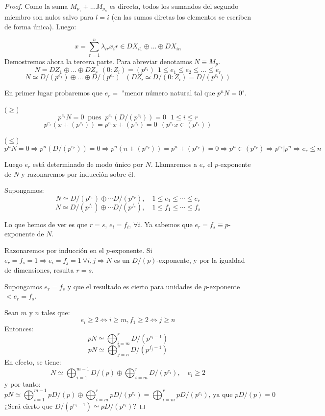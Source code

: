 \documentclass{article}
\theoremstyle{theorem-style}  %
\theoremstyle{definition}
\theoremstyle{example-style}
\begin{document}
\begin{proof}
		Como la suma $M_{p_1}+\dots M_{p_h}$ es directa, todos los sumandos del segundo miembro son nulos salvo para $l=i$ (en las sumas diretas los elementos se escriben de forma única). Luego:

		\[x=\sum_{r=1}^n\lambda_{ir}x_ir \in DX_{i1}\oplus\dots\oplus DX_{in}\]
		Demostremos ahora la tercera parte. Para abreviar denotamos $N\equiv M_p$.
		\[N=DZ_1\oplus\dots\oplus DZ_r \ \ (0:Z_i)=(p^{e_i}) \ \ 1\leq e_1\leq e_2 \leq\dots\leq e_r\]
		\[N\simeq D/(p^{e_1})\oplus\dots\oplus D/(p^{e_r}) \ \ \ (DZ_i\simeq D/(0:Z_i)=D/(p^{e_i})) \]

		En primer lugar probaremos que $e_r=$ "menor número natural tal que $p^nN=0$".
		
		($\geq$)
		\[p^{e_r}N=0 \  \text{ pues } \ p^{e_r}(D/(p^{e_i}))=0 \ \ \ 1\leq i\leq r\]
		\[p^{e_r}(x+(p^{e_i}))=p^{e_r}x+(p^{e_i})=0 \ \ (p^{e_r}x\in (p^{e_i}))\]

		($\leq$)
		\[p^nN=0\Rightarrow p^n(D/(p^{e_r}))=0 \Rightarrow p^n(n+(p^{e_r}))=p^n+(p^{e_r})=0 \Rightarrow p^n\in (p^{e_r}) \Rightarrow p^{e_r}|p^n \Rightarrow e_r \leq n\]

		Luego $e_r$ está determinado de modo único por $N$. Llamaremos a $e_r$ el $p$-exponente de $N$ y razonaremos por inducción sobre él.

		Supongamos:
		\[ N\simeq D/(p^{e_1}) \oplus \cdots D/(p^{e_r}), \quad 1\leq e_1\leq\cdots\leq e_r \]
		\[ N\simeq D/(p^{f_1}) \oplus \cdots D/(p^{f_s}), \quad 1\leq f_1\leq\cdots\leq f_s \]
		
		Lo que hemos de ver es que $ r=s $, $ e_i=f_i $, $ \forall i $.
		Ya sabemos que $ e_r=  f_s\equiv p$-exponente de $ N $.
		
		Razonaremos por inducción en el $ p $-exponente.
		Si $ e_r=f_s=1 \Rightarrow e_i=f_j=1 \ \forall i,j \Rightarrow N $ es un $ D/(p) $-exponente, y por la igualdad de dimensiones, resulta $ r=s $.
		
		Supongamos $ e_r=f_s $ y que el resultado es cierto para unidades de $ p $-exponente $ <e_r=f_s $.
		
		Sean $ m $ y $ n $ tales que:
		\[ e_i\geq 2\Leftrightarrow i\geq m, f_1 \geq 2 \Leftrightarrow j \geq n \]
		Entonces: 
		\[ pN\simeq \bigoplus_{i=m}^r D/(p^{e_i-1})  \]
		\[ pN\simeq \bigoplus_{j=n}^s D/(p^{f_j-1})  \]		
		En efecto, se tiene:
		\[ N\simeq \bigoplus_{i=1}^{m-1} D/(p) \oplus  \bigoplus_{i=m}^{r}D/(p^{e_i}), \quad e_i \geq 2  \]
		y por tanto:
		\[ pN\simeq \bigoplus_{i=1}^{m-1} pD/(p) \oplus  \bigoplus_{i=m}^{r}pD/(p^{e_i}) = \bigoplus_{i=m}^{r}pD/(p^{e_i}) \text{, ya que } pD/(p)=0 \]
		¿Será cierto que $ D/(p^{e_i-1})\simeq pD/(p^{e_i}) $?


\end{proof}
\end{document}
